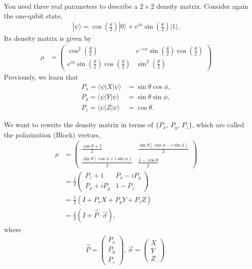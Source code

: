 \documentclass{beamer}
\begin{document}
\begin{frame}
\justify
You need three real parameters to describe a $2\times 2$ density matrix.
\vfill
Consider again the one-qubit state,
\begin{align}
|\psi\rangle = \cos\left(\frac{\theta}{2}\right) |0\rangle + e^{i \phi} \sin\left(\frac{\theta}{2}\right) |1\rangle.
\end{align}
\vfill
Its density matrix is given by
\begin{align}
\rho & = \begin{pmatrix}
\cos^2 \left(\frac{\theta}{2}\right) & e^{-i\phi} \sin \left(\frac{\theta}{2}\right) \cos \left(\frac{\theta}{2}\right) \\ e^{i\phi} \sin \left(\frac{\theta}{2}\right) \cos \left(\frac{\theta}{2}\right) & \sin^2 \left(\frac{\theta}{2}\right)
\end{pmatrix}
\end{align}
\vfill
Previously, we learn that
\begin{align}
P_x = \langle\psi|X|\psi\rangle & = \sin\theta \cos\phi, \\
P_y = \langle\psi|Y|\psi\rangle & = \sin\theta \sin\phi, \\
P_z = \langle\psi|Z|\psi\rangle & = \cos\theta.
\end{align}
\end{frame}

\begin{frame}
\justify
We want to rewrite the density matrix in terms of $\{P_x,\, P_y,\, P_z\}$, which are called the polarization (Bloch) vectors,
\begin{align}
\rho & = \begin{pmatrix}
\frac{\cos\theta +1}{2} & \frac{\sin\theta(\cos\phi - i \sin\phi)}{2} \\ \frac{\sin\theta (\cos\phi + i\sin\phi)}{2} & \frac{1-\cos\theta}{2}
\end{pmatrix} \nonumber \\
& = \frac{1}{2} \begin{pmatrix}
P_z + 1 & P_x - i P_y \\ P_x + iP_y & 1 - P_z
\end{pmatrix} \nonumber \\
& = \frac{1}{2} \left( I + P_x X + P_y Y + P_z Z \right) \nonumber \\
& = \frac{1}{2} \left( I + \vec{P} \cdot \vec{\sigma} \right),
\end{align}
where
\begin{align}
\vec{P} = \begin{pmatrix} P_x \\ P_y \\ P_z \end{pmatrix},\, \vec{\sigma} = \begin{pmatrix} X \\ Y \\ Z \end{pmatrix}.
\end{align}
\end{frame}
\end{document}

